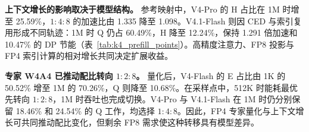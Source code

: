 \textbf{上下文增长的影响取决于模型结构。} 参考映射中，V4-Pro 的 H 占比在 1M 时增至 25.59\%，$1:4:8$ 的加速比由 1.335 降至 1.098。V4.1-Flash 则因 CED 与索引复用形成不同轨迹：1M 时 Q 仍占 60.49\%，H 降至 12.24\%，保持 1.291 倍加速和 10.47\% 的 DP 节能（表~\ref{tab:k4_prefill_points}）。高精度注意力、FP8 投影与 FP4 索引计算的相对增长共同决定扩展收益。

\textbf{专家 W4A4 已推动配比转向 $1:2:8$。} 量化后，V4-Flash 的 E 占比由 1K 的 50.52\% 增至 1M 的 70.26\%，Q 则降至 10.68\%。在采样点中，512K 时能耗最优先转向 $1:2:8$，1M 时吞吐也完成切换。V4-Pro 与 V4.1-Flash 在 1M 时仍分别保留 18.46\% 和 24.54\% 的 Q 工作，均选择 $1:4:8$。因此，FP4 专家量化与上下文增长可共同推动配比变化，但剩余 FP8 需求使这种转移具有模型差异。
